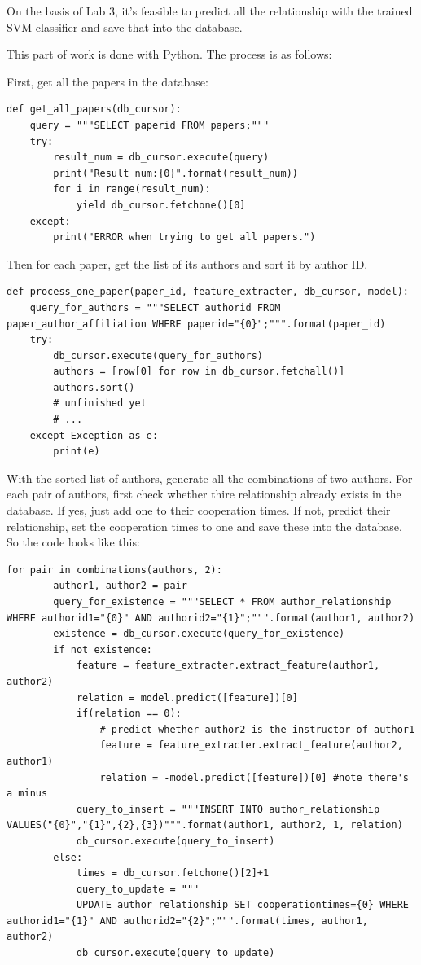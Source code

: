 \documentclass[a4paper]{article}
\begin{document}
On the basis of Lab 3, it's feasible to predict all the relationship with the trained SVM classifier and save that into the database. 

This part of work is done with Python. The process is as follows:

First, get all the papers in the database:
\begin{verbatim}
def get_all_papers(db_cursor):
    query = """SELECT paperid FROM papers;"""
    try:
        result_num = db_cursor.execute(query)
        print("Result num:{0}".format(result_num))
        for i in range(result_num):
            yield db_cursor.fetchone()[0]
    except:
        print("ERROR when trying to get all papers.")
\end{verbatim}
Then for each paper, get the list of its authors and sort it by author ID.
\begin{verbatim}
def process_one_paper(paper_id, feature_extracter, db_cursor, model):
    query_for_authors = """SELECT authorid FROM paper_author_affiliation WHERE paperid="{0}";""".format(paper_id)
    try:
        db_cursor.execute(query_for_authors)
        authors = [row[0] for row in db_cursor.fetchall()]
        authors.sort()
        # unfinished yet
        # ...
    except Exception as e:
        print(e)
\end{verbatim} 
With the sorted list of authors, generate all the combinations of two authors. For each pair of authors, first check whether thire relationship already exists in the database. If yes, just add one to their cooperation times. If not, predict their relationship, set the cooperation times to one and save these into the database. So the code looks like this:
\begin{verbatim}
for pair in combinations(authors, 2):
        author1, author2 = pair
        query_for_existence = """SELECT * FROM author_relationship WHERE authorid1="{0}" AND authorid2="{1}";""".format(author1, author2)
        existence = db_cursor.execute(query_for_existence)
        if not existence:
            feature = feature_extracter.extract_feature(author1, author2)
            relation = model.predict([feature])[0]
            if(relation == 0):  
                # predict whether author2 is the instructor of author1
                feature = feature_extracter.extract_feature(author2, author1)
                relation = -model.predict([feature])[0] #note there's a minus
            query_to_insert = """INSERT INTO author_relationship VALUES("{0}","{1}",{2},{3})""".format(author1, author2, 1, relation)
            db_cursor.execute(query_to_insert)
        else:
            times = db_cursor.fetchone()[2]+1
            query_to_update = """
            UPDATE author_relationship SET cooperationtimes={0} WHERE authorid1="{1}" AND authorid2="{2}";""".format(times, author1, author2)
            db_cursor.execute(query_to_update)     
\end{verbatim} 
\end{document}

